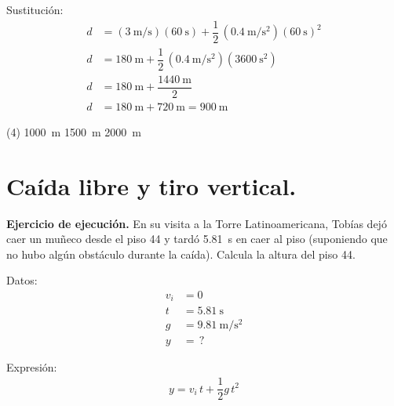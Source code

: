 \documentclass[12pt, letter]{exam}
\begin{document}
\begin{questions}
    Sustitución:
    \begin{align*}
    d &= \left( \SI[per-mode=fraction]{3}{\meter\per\second} \right) \left( \SI{60}{\second} \right) + \dfrac{1}{2} \, \left( \SI[per-mode=fraction]{0.4}{\meter\per\square\second} \right) \left( \SI{60}{\second} \right)^{2} \\[0.5em]
    d &= \SI{180}{\meter} + \dfrac{1}{2} \, \left( \SI[per-mode=fraction]{0.4}{\meter\per\square\second} \right) \left( \SI{3600}{\square\second} \right) \\[0.5em]
    d &= \SI{180}{\meter} + \dfrac{\SI{1440}{\meter}}{2} \\[0.5em]
    d &= \SI{180}{\meter} + \SI{720}{\meter} = \SI{900}{\meter}
    \end{align*}
    \begin{tasks}(4)
        \task {}
        \task \SI{1000}{\meter}
        \task \SI{1500}{\meter}
        \task \SI{2000}{\meter}
    \end{tasks}

    \section{Caída libre y tiro vertical.}

    \setcounter{question}{11} \question \label{Ejercicio_05} \textbf{Ejercicio de ejecución. } En su visita a la Torre Latinoamericana, Tobías dejó caer un muñeco desde el piso \num{44} y tardó \SI{5.81}{\second} en caer al piso (suponiendo que no hubo algún obstáculo durante la caída). Calcula la altura del piso \num{44}.

    \begin{minipage}[t]{0.35\linewidth}
    Datos: 
    \begin{align*}
    v_{i} &= 0 \\
    t &= \SI{5.81}{\second} \\
    g &= \SI{9.81}{\meter\per\square\second} \\
    y &= \, ?
    \end{align*}
    \end{minipage}
    \hspace{1cm}
    \begin{minipage}[t]{0.4\linewidth}
    Expresión:
    \begin{align*}
    y = v_{i} \, t + \dfrac{1}{2} g \, t^{2}
    \end{align*}
    \end{minipage}


\end{questions}
\end{document}
